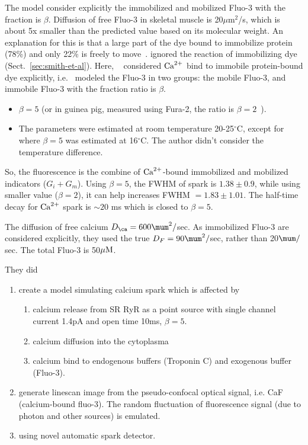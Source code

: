 The model consider explicitly the immobilized and mobilized Fluo-3 with the
fraction is $\beta$. Diffusion of free Fluo-3 in skeletal muscle is
20$\mu$m$^2$/s, which is about 5x smaller than the predicted value based on its
molecular weight. An explanation for this is that a large part of the dye bound
to immobilize protein (78\%) and only 22\% is freely to
move~\citep{harkins1993}.  \citep{smith1998} ignored the reaction of
immobilizing dye (Sect.~\ref{sec:smith-et-al}). Here, ~\citep{izu1998}
considered ${\text{Ca}^{2+}}$ bind to immobile protein-bound dye explicitly,
i.e.~\citep{izu1998} modeled the Fluo-3 in two groups: the mobile Fluo-3, and
immobile Fluo-3 with the fraction ratio is $\beta$.
\begin{itemize}
\item $\beta=5$ (or in guinea pig, measured using Fura-2, the ratio is
  $\beta=2$~\citep{blatter1990}).

\item The parameters were estimated at room temperature
  20-25$^\circ$C, except for~\citep{harkins1993} where $\beta=5$ was
  estimated at 16$^\circ$C. The author didn't consider the temperature
  difference.
\end{itemize}
So, the fluorescence is the combine of ${\text{Ca}^{2+}}$-bound immobilized and mobilized
indicators ($G_i+G_m$). Using $\beta = 5$, the FWHM of spark is $1.38\pm 0.9$,
while using smaller value ($\beta=2$), it can help increases FWHM $= 1.83\pm
1.01$. The half-time decay for ${\text{Ca}^{2+}}$ spark is $\sim 20$ ms which is closed to
$\beta = 5$. 

The diffusion of free calcium $D_\ca = 600\mum^2/$sec. As immobilized Fluo-3 are
considered explicitly, they used the true $D_F=90\mum^2/$sec, rather than
20$\mum/$sec. The total Fluo-3 is 50${\mu\text{M}}$.

They did
\begin{enumerate}
\item create a model simulating calcium spark which is affected by
  \begin{enumerate}
  \item calcium release from SR RyR as a point source with single channel
  current 1.4pA and open time 10ms, $\beta = 5$.
  \item calcium diffusion into the cytoplasma
  \item calcium bind to endogenous buffers (Troponin C) and
    exogenous buffer (Fluo-3).
  \end{enumerate}
\item generate linescan image from the pseudo-confocal optical
  signal, i.e.  CaF (calcium-bound fluo-3). The random fluctuation of
  fluorescence signal (due to photon and other sources) is emulated.
\item using novel automatic spark detector.
\end{enumerate}

